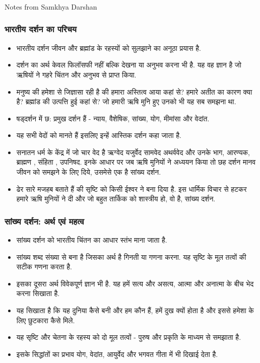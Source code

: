 \begin{frame}[fragile]\frametitle{}
\begin{center}
{\Large Notes from Samkhya Darshan}
\end{center}
\end{frame}

\begin{frame}[fragile]\frametitle{भारतीय दर्शन का परिचय}
      \begin{itemize}
	\item भारतीय दर्शन जीवन और ब्रह्मांड के रहस्यों को सुलझाने का अनूठा प्रयास है.
	\item दर्शन का अर्थ केवल फिलॉसफी नहीं बल्कि देखना या अनुभव करना भी है. यह वह ज्ञान है जो ऋषियों ने गहरे चिंतन और अनुभव से प्राप्त किया.
    \item मनुष्य की हमेशा से जिज्ञासा रही है की हमारा अस्तित्व आया कहां से? हमारे अतीत का कारण क्या है? ब्रह्मांड की उत्पत्ति हुई कहां से? जो हमारी ऋषि मुनि हुए उनको भी यह सब समझना था.
	\item षड्दर्शन में छ: प्रमुख दर्शन हैं - न्याय, वैशेषिक, सांख्य, योग, मीमांसा और वेदांत.
	\item यह सभी वेदों को मानते हैं इसलिए इन्हें आस्तिक दर्शन कहा जाता है.
    \item सनातन धर्म के केंद्र में जो चार वेद है ऋग्वेद यजुर्वेद सामवेद अथर्ववेद और उनके भाग, आरण्यक, ब्राह्मण , संहिता , उपनिषद. इनके आधार पर जब ऋषि मुनियों ने अध्ययन किया तो छह दर्शन मानव जीवन को समझने के लिए दिये, उसमेसे एक है सांख्य दर्शन.
    \item ढेर सारे मजहब बताते हैं की सृष्टि को किसी ईश्वर ने बना दिया है. इस धार्मिक विचार से हटकर हमारे ऋषि मुनियों ने दी और जो बहुत तार्किक को शास्त्रीय हो, वो है, सांख्य दर्शन.
	  \end{itemize}
\end{frame}

\begin{frame}[fragile]\frametitle{सांख्य दर्शन: अर्थ एवं महत्व}
  \begin{itemize}
	\item सांख्य दर्शन को भारतीय चिंतन का आधार स्तंभ माना जाता है.
    \item सांख्य शब्द संख्या से बना है जिसका अर्थ है गिनती या गणना करना. यह सृष्टि के मूल तत्वों की सटीक गणना करता है.
    \item इसका दूसरा अर्थ विवेकपूर्ण ज्ञान भी है. यह हमें सत्य और असत्य, आत्मा और अनात्मा के बीच भेद करना सिखाता है.
	\item यह सिखाता है कि यह दुनिया कैसे बनी और हम कौन हैं, हमें दुख क्यों होता है और इससे हमेशा के लिए छुटकारा कैसे मिले.
	\item यह सृष्टि और चेतना के रहस्य को दो मूल तत्वों - पुरुष और प्रकृति के माध्यम से समझाता है.
    \item इसके सिद्धांतों का प्रभाव योग, वेदांत, आयुर्वेद और भगवत गीता में भी दिखाई देता है.
  \end{itemize}
\end{frame}

